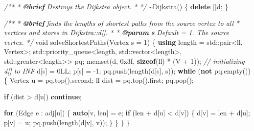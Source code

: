 \documentclass[
]{article}
\newenvironment{Shaded}{}{}
\newcommand{\AnnotationTok}[1]{\textcolor[rgb]{0.38,0.63,0.69}{\textbf{\textit{#1}}}}
\newcommand{\BaseNTok}[1]{\textcolor[rgb]{0.25,0.63,0.44}{#1}}
\newcommand{\BuiltInTok}[1]{#1}
\newcommand{\CommentTok}[1]{\textcolor[rgb]{0.38,0.63,0.69}{\textit{#1}}}
\newcommand{\CommentVarTok}[1]{\textcolor[rgb]{0.38,0.63,0.69}{\textbf{\textit{#1}}}}
\newcommand{\ControlFlowTok}[1]{\textcolor[rgb]{0.00,0.44,0.13}{\textbf{#1}}}
\newcommand{\DataTypeTok}[1]{\textcolor[rgb]{0.56,0.13,0.00}{#1}}
\newcommand{\DecValTok}[1]{\textcolor[rgb]{0.25,0.63,0.44}{#1}}
\newcommand{\KeywordTok}[1]{\textcolor[rgb]{0.00,0.44,0.13}{\textbf{#1}}}
\newcommand{\NormalTok}[1]{#1}
\begin{document}
\begin{Shaded}
\begin{Highlighting}[]
    \CommentTok{/**}
\CommentTok{     * }\AnnotationTok{@brief}\CommentTok{ Destroys the Dijkstra object.}
\CommentTok{     * }
\CommentTok{     */}
\NormalTok{    \textasciitilde{}Dijkstra() \{}
        \KeywordTok{delete}\NormalTok{ []d;}
\NormalTok{    \}}

    \CommentTok{/**}
\CommentTok{     * }\AnnotationTok{@brief}\CommentTok{ finds the lengths of shortest paths from the source vertex to all }
\CommentTok{     * vertices and stores in Dijkstra::d[].}
\CommentTok{     * }
\CommentTok{     * }\AnnotationTok{@param}\CommentTok{ }\CommentVarTok{s}\CommentTok{ Default = 1. The source vertex.}
\CommentTok{     */}
    \DataTypeTok{void}\NormalTok{ solveShortestPaths(Vertex s = }\DecValTok{1}\NormalTok{) \{}
        \KeywordTok{using}\NormalTok{ length = }\BuiltInTok{std::}\NormalTok{pair\textless{}ll, Vertex\textgreater{};}
        \BuiltInTok{std::}\NormalTok{priority\_queue\textless{}length, }\BuiltInTok{std::}\NormalTok{vector\textless{}length\textgreater{}, }\BuiltInTok{std::}\NormalTok{greater\textless{}length\textgreater{}\textgreater{} }
\NormalTok{                                                                            pq;}
\NormalTok{        memset(d, }\BaseNTok{0x3f}\NormalTok{, }\KeywordTok{sizeof}\NormalTok{(ll) * (V + }\DecValTok{1}\NormalTok{)); }\CommentTok{// initializing d[] to INF}
\NormalTok{        d[s] = }\DecValTok{0}\BuiltInTok{LL}\NormalTok{;}
\NormalTok{        p[s] = {-}}\DecValTok{1}\NormalTok{;}
\NormalTok{        pq.push(length(d[s], s));}
        \ControlFlowTok{while}\NormalTok{ (}\KeywordTok{not}\NormalTok{ pq.empty()) \{}
\NormalTok{            Vertex u = pq.top().second;}
\NormalTok{            ll dist = pq.top().first;}
\NormalTok{            pq.pop();}

            \ControlFlowTok{if}\NormalTok{ (dist \textgreater{} d[u])}
                \ControlFlowTok{continue}\NormalTok{;}

            \ControlFlowTok{for}\NormalTok{ (Edge e : adj[u]) \{}
                \KeywordTok{auto}\NormalTok{[v, len] = e;}
                \ControlFlowTok{if}\NormalTok{ (len + d[u] \textless{} d[v]) \{}
\NormalTok{                    d[v] = len + d[u];}
\NormalTok{                    p[v] = u;}
\NormalTok{                    pq.push(length(d[v], v));}
\NormalTok{                \}}
\NormalTok{            \}}
\NormalTok{        \}}
\NormalTok{    \}}


\end{Highlighting}
\end{Shaded}
\end{document}
